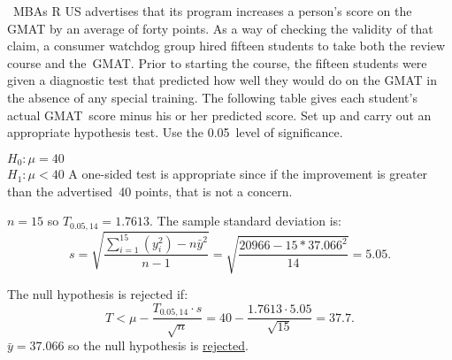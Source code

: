 \begin{problem}
  ~MBAs R US advertises that its program increases a person's score on the GMAT by an average of forty points.  As a way of checking the validity of that claim, a consumer watchdog group hired fifteen students to take both the review course and the~GMAT\@.  Prior to starting the course, the fifteen students were given a diagnostic test that predicted how well they would do on the GMAT in the absence of any special training.  The following table gives each student's actual GMAT~score minus his or her predicted score.  Set up and carry out an appropriate hypothesis test.  Use the 0.05~level of significance.
\end{problem}

\noindent
$H_0: \mu = 40$\\
$H_1: \mu < 40$  A one-sided test is appropriate since if the improvement is greater than the advertised~40 points, that is not a concern.

${n = 15}$ so ${T_{0.05,14} = 1.7613}$.  The sample standard deviation is:
\begin{equation}
  s = \sqrt{\frac{\sum_{i=1}^{15} \left(y_{i}^2\right) - n \bar{y}^2}{n-1}} = \sqrt{\frac{20966 - 15 * 37.066^2}{14}} = 5.05\text{.}
\end{equation}

The null hypothesis is rejected if:
\begin{equation}
  T < \mu - \frac{T_{0.05,14} \cdot s}{\sqrt{n}} = 40 - \frac{1.7613 \cdot 5.05}{\sqrt{15}} = 37.7\text{.}
\end{equation}
${\bar{y} = 37.066}$ so the null hypothesis is \underline{rejected}.
